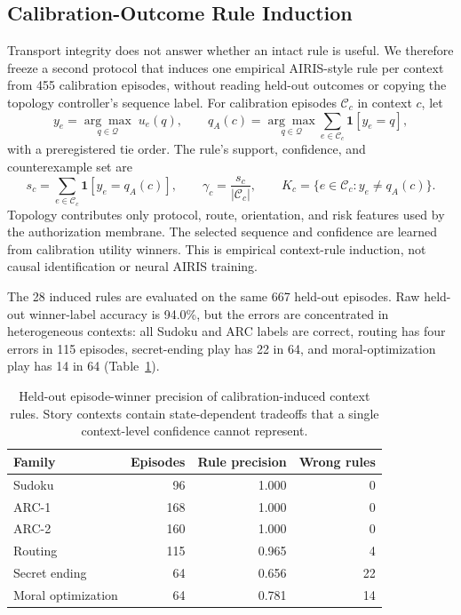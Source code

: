 \documentclass[11pt]{article}
\begin{document}
\subsection{Calibration-Outcome Rule Induction}

Transport integrity does not answer whether an intact rule is useful. We therefore freeze a second protocol
that induces one empirical AIRIS-style rule per context from 455 calibration episodes, without reading held-out
outcomes or copying the topology controller's sequence label. For calibration episodes $\mathcal C_c$ in context
$c$, let
\[
  y_e=\underset{q\in\mathcal Q}{\arg\max}\;u_e(q),\qquad
  q_A(c)=\underset{q\in\mathcal Q}{\arg\max}\sum_{e\in\mathcal C_c}\mathbf 1[y_e=q],
\]
with a preregistered tie order. The rule's support, confidence, and counterexample set are
\[
  s_c=\sum_{e\in\mathcal C_c}\mathbf 1[y_e=q_A(c)],\qquad
  \gamma_c=\frac{s_c}{|\mathcal C_c|},\qquad
  K_c=\{e\in\mathcal C_c:y_e\ne q_A(c)\}.
\]
Topology contributes only protocol, route, orientation, and risk features used by the authorization membrane.
The selected sequence and confidence are learned from calibration utility winners. This is empirical
context-rule induction, not causal identification or neural AIRIS training.

The 28 induced rules are evaluated on the same 667 held-out episodes. Raw held-out winner-label accuracy is
94.0\%, but the errors are concentrated in heterogeneous contexts: all Sudoku and ARC labels are correct,
routing has four errors in 115 episodes, secret-ending play has 22 in 64, and moral-optimization play has 14 in
64 (Table~\ref{tab:airis-induction}).

\begin{table}[t]
\centering
\begin{tabular}{lrrr}
\toprule
Family & Episodes & Rule precision & Wrong rules \\
\midrule
Sudoku & 96 & 1.000 & 0 \\
ARC-1 & 168 & 1.000 & 0 \\
ARC-2 & 160 & 1.000 & 0 \\
Routing & 115 & 0.965 & 4 \\
Secret ending & 64 & 0.656 & 22 \\
Moral optimization & 64 & 0.781 & 14 \\
\bottomrule
\end{tabular}
\caption{Held-out episode-winner precision of calibration-induced context rules. Story contexts contain
state-dependent tradeoffs that a single context-level confidence cannot represent.}
\label{tab:airis-induction}
\end{table}
\end{document}
